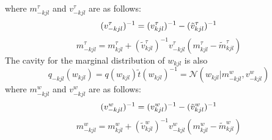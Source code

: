 \documentclass[]{article}
\begin{document}
where $m^\tau_{-kjl}$ and $v^\tau_{-kjl}$ are as follows:
\begin{equation}
	(v^\tau_{-kjl})^{-1} = (v^\tau_{kjl})^{-1} - (\tilde{v}^\tau_{kjl})^{-1}
	\notag
\end{equation}
\begin{equation}
	m^\tau_{-kjl} = m^\tau_{kjl} + (\tilde{v}^{\tau}_{kjl})^{-1} v^\tau_{-kjl} (m^\tau_{kjl} - \tilde{m}^\tau_{kjl})
	\label{equ:36}
\end{equation}
The cavity for the marginal distribution of $w_{kjl}$ is also 
\begin{equation}
	q_{-kjl}(w_{kjl}) = q(w_{kjl})\tilde{t}(w_{kjl})^{-1} = \mathcal{N}(w_{kjl}|m^w_{-kjl},v^w_{-kjl})
	\label{equ:35}
\end{equation}
where $m^w_{-kjl}$ and $v^w_{-kjl}$ are as follows:
\begin{equation}
	(v^w_{-kjl})^{-1} = (v^w_{kjl})^{-1} - (\tilde{v}^w_{kjl})^{-1}
	\notag
\end{equation}
\begin{equation}
	m^w_{-kjl} = m^w_{kjl} + (\tilde{v}^w_{kjl})^{-1} v^w_{-kjl} (m^w_{kjl} - \tilde{m}^w_{kjl})
	\label{equ:36}
\end{equation}
\end{document}
